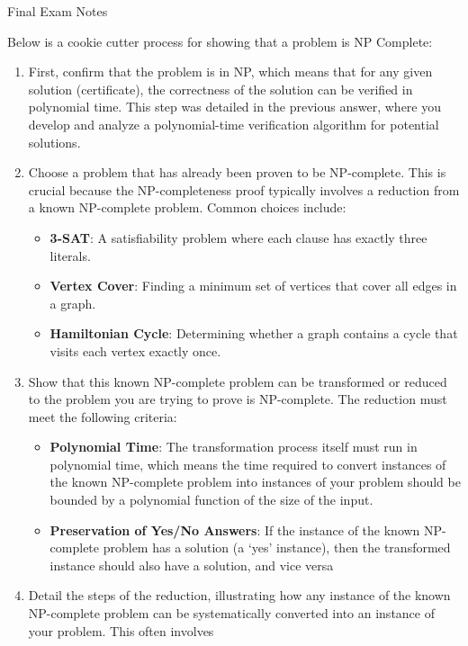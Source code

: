 \begin{examnotes}{Final Exam Notes}
    \begin{highlight}
        Below is a cookie cutter process for showing that a problem is NP Complete:

        \begin{enumerate}
            \item First, confirm that the problem is in NP, which means that for any given solution (certificate), the correctness of the solution can be verified in polynomial time. This step was 
            detailed in the previous answer, where you develop and analyze a polynomial-time verification algorithm for potential solutions.
            \item Choose a problem that has already been proven to be NP-complete. This is crucial because the NP-completeness proof typically involves a reduction from a known NP-complete problem. 
            Common choices include:
            \begin{itemize}
                \item \textbf{3-SAT}: A satisfiability problem where each clause has exactly three literals.
                \item \textbf{Vertex Cover}: Finding a minimum set of vertices that cover all edges in a graph.
                \item \textbf{Hamiltonian Cycle}: Determining whether a graph contains a cycle that visits each vertex exactly once.
            \end{itemize}
            \item Show that this known NP-complete problem can be transformed or reduced to the problem you are trying to prove is NP-complete. The reduction must meet the following criteria:
            \begin{itemize}
                \item \textbf{Polynomial Time}: The transformation process itself must run in polynomial time, which means the time required to convert instances of the known NP-complete problem into 
                instances of your problem should be bounded by a polynomial function of the size of the input.
                \item \textbf{Preservation of Yes/No Answers}: If the instance of the known NP-complete problem has a solution (a `yes' instance), then the transformed instance should also have a 
                solution, and vice versa
            \end{itemize}
            \item Detail the steps of the reduction, illustrating how any instance of the known NP-complete problem can be systematically converted into an instance of your problem. This often involves 

\end{enumerate}
\end{highlight}
\end{examnotes}
